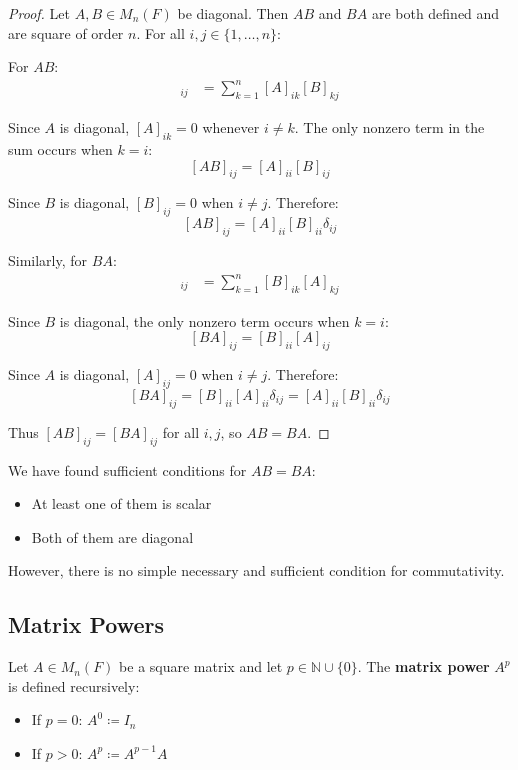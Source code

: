 \begin{proof}
    Let $A, B \in M_n(F)$ be diagonal. Then $AB$ and $BA$ are both defined and are square of order $n$. For all $i, j \in \{1, \ldots, n\}$:
    
    For $AB$:
    \begin{align*}
    [AB]_{ij} &= \sum_{k=1}^{n} [A]_{ik}[B]_{kj}
    \end{align*}
    
    Since $A$ is diagonal, $[A]_{ik} = 0$ whenever $i \neq k$. The only nonzero term in the sum occurs when $k = i$:
    \[
    [AB]_{ij} = [A]_{ii}[B]_{ij}
    \]
    
    Since $B$ is diagonal, $[B]_{ij} = 0$ when $i \neq j$. Therefore:
    \[
    [AB]_{ij} = [A]_{ii}[B]_{ii}\delta_{ij}
    \]
    
    Similarly, for $BA$:
    \begin{align*}
    [BA]_{ij} &= \sum_{k=1}^{n} [B]_{ik}[A]_{kj}
    \end{align*}
    
    Since $B$ is diagonal, the only nonzero term occurs when $k = i$:
    \[
    [BA]_{ij} = [B]_{ii}[A]_{ij}
    \]
    
    Since $A$ is diagonal, $[A]_{ij} = 0$ when $i \neq j$. Therefore:
    \[
    [BA]_{ij} = [B]_{ii}[A]_{ii}\delta_{ij} = [A]_{ii}[B]_{ii}\delta_{ij}
    \]
    
    Thus $[AB]_{ij} = [BA]_{ij}$ for all $i,j$, so $AB = BA$.
\end{proof}

\begin{note}
    We have found sufficient conditions for $AB = BA$:
    \begin{itemize}
        \item At least one of them is scalar
        \item Both of them are diagonal
    \end{itemize}
    However, there is no simple necessary and sufficient condition for commutativity.
\end{note}

\subsection{Matrix Powers}

\begin{definition}\label{def:matrix-power}
    Let $A \in M_n(F)$ be a square matrix and let $p \in \mathbb{N} \cup \{0\}$. The \textbf{matrix power} $A^p$ is defined recursively:
    \begin{itemize}
        \item If $p = 0$: $A^0 \coloneqq I_n$
        \item If $p > 0$: $A^p \coloneqq A^{p-1}A$
    \end{itemize}
\end{definition}

